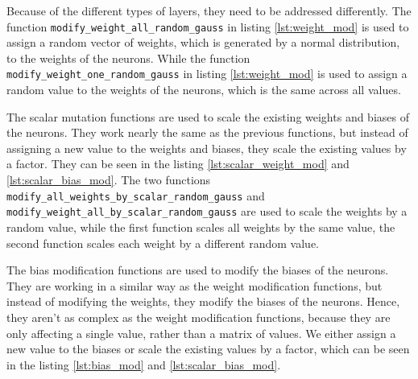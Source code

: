 Because of the different types of layers, they need to be addressed differently.
The function \texttt{modify\_weight\_all\_random\_gauss} in listing \ref{lst:weight_mod} is used to assign a random vector of weights, which is generated by a normal distribution, to the weights of the neurons.
While the function \texttt{modify\_weight\_one\_random\_gauss} in listing \ref{lst:weight_mod} is used to assign a random value to the weights of the neurons, which is the same across all values.

The scalar mutation functions are used to scale the existing weights and biases of the neurons.
They work nearly the same as the previous functions, but instead of assigning a new value to the weights and biases, they scale the existing values by a factor.
They can be seen in the listing \ref{lst:scalar_weight_mod} and \ref{lst:scalar_bias_mod}.
The two functions \texttt{modify\_all\_weights\_by\_scalar\_random\_gauss} and \texttt{modify\_weight\_all\_by\_scalar\_random\_gauss} are used to scale the weights by a random value, while the first function scales all weights by the same value, the second function scales each weight by a different random value.

The bias modification functions are used to modify the biases of the neurons.
They are working in a similar way as the weight modification functions, but instead of modifying the weights, they modify the biases of the neurons.
Hence, they aren't as complex as the weight modification functions, because they are only affecting a single value, rather than a matrix of values.
We either assign a new value to the biases or scale the existing values by a factor, which can be seen in the listing \ref{lst:bias_mod} and \ref{lst:scalar_bias_mod}.

